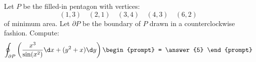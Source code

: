 \documentclass{ximera}
\begin{document}
\begin{exercise}
  Let $P$ be the filled-in pentagon with vertices:
  \[
  (1,3)\quad (2,1)\quad (3,4)\quad (4,3) \quad (6,2)
  \]
  of minimum area.  Let $\partial P$ be the boundary of $P$ drawn in a
  counterclockwise fashion. Compute:
  \[
  \oint_{\partial P} \left(\frac{x^3}{\sin(x^2)}\d x + (y^2+x)\d y\right)
  \begin{prompt}
    = \answer{5}
  \end{prompt}
  \]
\end{exercise}
\end{document}
